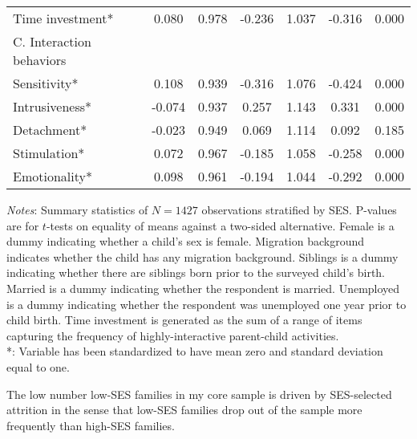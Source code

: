 \begin{table}[!htbp]
\begin{threeparttable}
\begin{tabular}[t]{lcccccc}
			\hspace{5mm}Time investment* & 0.080 & 0.978 & -0.236 & 1.037 & -0.316 & 0.000\\
			C. Interaction behaviors &&&&&&           \\
			\hspace{5mm}Sensitivity* & 0.108 & 0.939 & -0.316 & 1.076 & -0.424 & 0.000\\
			\hspace{5mm}Intrusiveness* & -0.074 & 0.937 & 0.257 & 1.143 & 0.331 & 0.000\\
			\hspace{5mm}Detachment* & -0.023 & 0.949 & 0.069 & 1.114 & 0.092 & 0.185\\
			\hspace{5mm}Stimulation* & 0.072 & 0.967 & -0.185 & 1.058 & -0.258 & 0.000\\
			\hspace{5mm}Emotionality* & 0.098 & 0.961 & -0.194 & 1.044 & -0.292 & 0.000\\
			\hline\hline
		\end{tabular}
	\begin{tablenotes}
		\small
		\item \textit{Notes}: Summary statistics of $N = 1427$ observations stratified by SES. P-values are for $t$-tests on equality of means against a two-sided alternative. Female is a dummy indicating whether a child's sex is female. Migration background indicates whether the child has any migration background. Siblings is a dummy indicating whether there are siblings born prior to the surveyed child's birth. Married is a dummy indicating whether the respondent is married. Unemployed is a dummy indicating whether the respondent was unemployed one year prior to child birth. Time investment is generated as the sum of a range of items capturing the frequency of highly-interactive parent-child activities.\\ *: Variable has been standardized to have mean zero and standard deviation equal to one.
	\end{tablenotes}
	\end{threeparttable}
\end{table}
%
The low number low-SES families in my core sample is driven by SES-selected attrition in the sense that low-SES families drop out of the sample more frequently than high-SES families. %
